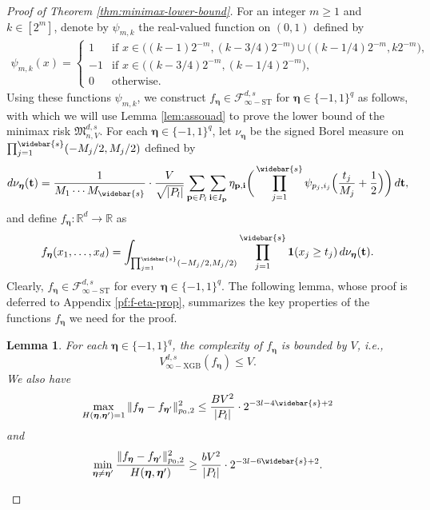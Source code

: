 \documentclass[10pt]{article}
\newtheorem{lemma}{Lemma}
\newcommand{\R}{{\mathbb R}}
\newcommand{\fstinf}{{\mathcal{F}^{d, s}_{\infty-\text{ST}}}}
\newcommand{\vinfxgb}{{V^{d, s}_{\infty-\text{XGB}}}}
\newcommand{\minimax}{{\mathfrak{M}^{d, s}_{n, V}}}
\newcommand{\pbf}{{\mathbf{p}}}
\newcommand{\ibf}{{\mathbf{i}}}
\newcommand{\tbf}{{\mathbf{t}}}
\newcommand{\etabf}{{\boldsymbol{\eta}}}
\newcommand{\ind}{{\mathbf{1}}}
\begin{document}
\begin{proof}[Proof of Theorem \ref{thm:minimax-lower-bound}]
For an integer $m \ge 1$ and $k \in [2^m]$, denote by $\psi_{m, k}$ the 
real-valued function on $(0, 1)$ defined by
\begin{equation*}
\begin{aligned}
    \psi_{m, k}(x) = 
    \begin{cases}
        1 &\mbox{if } x \in \big((k-1)2^{-m}, (k-3/4)2^{-m}\big) \cup 
        \big((k-1/4)2^{-m}, k2^{-m}\big), \\
        -1 &\mbox{if } x \in \big((k-3/4)2^{-m}, 
        (k-1/4)2^{-m}\big), \\
        0 &\mbox{otherwise}. 
    \end{cases}
\end{aligned}
\end{equation*}
Using these functions $\psi_{m, k}$, we construct $f_{\etabf} \in \fstinf$ 
for $\etabf \in \{-1, 1\}^q$ as follows, with which we will use Lemma 
\ref{lem:assouad} 
to prove the lower bound of the minimax risk $\minimax$. For each 
$\etabf \in \{-1, 1\}^q$, let $\nu_{\etabf}$ be the signed Borel measure on 
$\prod_{j = 1}^{\widebar{s}} (-M_j/2, M_j/2)$ defined by
\begin{equation*}
    d\nu_{\etabf}(\tbf) = \frac{1}{M_1 \cdots M_{\widebar{s}}} 
    \cdot \frac{V}{\sqrt{|P_l|}} 
    \sum_{\pbf \in P_l} \sum_{\ibf \in I_{\pbf}} 
    \eta_{\pbf, \ibf} \bigg(\prod_{j = 1}^{\widebar{s}} 
    \psi_{p_j, i_j}\Big(\frac{t_j}{M_j} + \frac{1}{2}\Big)\bigg) 
    \, d\tbf,
\end{equation*}
and define $f_{\etabf}: \R^d \rightarrow \R$ as
\begin{equation*}
    f_{\etabf}(x_1, \dots, x_d) 
    = \int_{\prod_{j = 1}^{\widebar{s}} (-M_j/2, M_j/2)} 
    \prod_{j = 1}^{\widebar{s}} \ind(x_j \ge t_j) 
    \, d\nu_{\etabf}(\tbf).
\end{equation*}
Clearly, $f_{\etabf} \in \fstinf$ for every $\etabf \in \{-1, 1\}^q$. 
The following lemma, whose proof is deferred to 
Appendix \ref{pf:f-eta-prop}, summarizes the key properties of the 
functions $f_{\etabf}$ we need for the proof.

\begin{lemma}\label{lem:f-eta-prop}
For each $\etabf \in \{-1, 1\}^q$, the complexity of $f_{\etabf}$ is 
bounded by $V$, i.e.,
\begin{equation}\label{f-eta-compl}
    \vinfxgb(f_\etabf) \le V.
\end{equation}
We also have 
\begin{equation}\label{f-eta-first-dist-prop}
    \max_{H(\etabf, \etabf') = 1} 
    \| f_\etabf - f_{\etabf'} \|_{p_0, 2}^2 
    \le \frac{B V^2}{|P_l|} \cdot 2^{-3l - 4\widebar{s} + 2}
\end{equation}
and 
\begin{equation}\label{f-eta-second-dist-prop}
    \min_{\etabf \neq \etabf'} 
    \frac{\| f_\etabf - f_{\etabf'}\|_{p_0, 2}^2}{H(\etabf, \etabf')} 
    \ge \frac{b V^2}{|P_l|} \cdot 2^{-3l - 6\widebar{s} + 2}.
\end{equation}
\end{lemma}


\end{proof}
\end{document}
